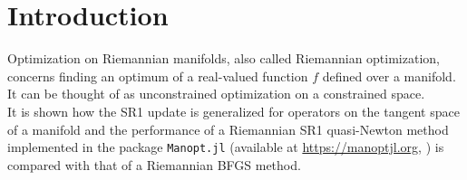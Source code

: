 \chapter{Introduction}

Optimization on Riemannian manifolds, also called Riemannian optimization, concerns finding an optimum of a real-valued function $f$ defined over a manifold. It can be thought of as unconstrained optimization on a constrained space. \\
It is shown how the SR1 update is generalized for operators on the tangent space of a manifold and the performance of a Riemannian SR1 quasi-Newton method implemented in the package \lstinline!Manopt.jl! (available at \url{https://manoptjl.org}, \cite{Bergmann:2019}) is compared with that of a Riemannian BFGS method.

